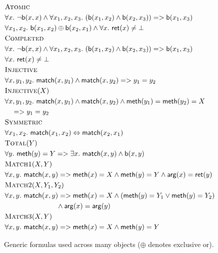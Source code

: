 \begin{figure}
  \footnotesize
  \begin{align*}
    & \textsc{Atomic} \\
    & \forall x.\ \neg {\sf b}(x,x)\land \forall x_1,x_2,x_3.\ ({\sf b}(x_1,x_2) \land {\sf b}(x_2,x_3)) => {\sf b}(x_1,x_3) \\
    & \forall x_1,x_2.\ 
      {\sf b}(x_1,x_2) \oplus {\sf b}(x_2,x_1) \land \forall x.\ {\sf ret}(x) \neq \bot 
    \\
    & \textsc{Completed} \\
    & \forall x.\ \neg {\sf b}(x,x)\land \forall x_1,x_2,x_3.\ ({\sf b}(x_1,x_2) \land {\sf b}(x_2,x_3)) => {\sf b}(x_1,x_3) \\
    & \forall x.\ {\sf ret}(x) \neq \bot
    \\
    & \textsc{Injective} \\
    & \forall x, y_1, y_2.\ {\sf match}(x, y_1) \land {\sf match}(x, y_2) => y_1 = y_2
    \\
    & \textsc{Injective}(X) \\
    & \forall x, y_1, y_2.\ {\sf match}(x, y_1) \land {\sf match}(x, y_2) \land {\sf meth}(y_1)={\sf meth}(y_2)=X \\
    &\quad => y_1 = y_2
    \\
    & \textsc{Symmetric} \\
    & \forall x_1,x_2.\ {\sf match}(x_1,x_2) \Leftrightarrow {\sf match}(x_2,x_1)
    \\
    & \textsc{Total}(Y) \\
    & \forall y.\ {\sf meth}(y) = Y => \exists x.\ {\sf match}(x,y) \land {\sf b}(x,y)
    \\
    & \textsc{Match1}(X,Y) \\
    & \forall x, y.\ {\sf match}(x,y) => 
        {\sf meth}(x) = X \land {\sf meth}(y) = Y \land {\sf arg}(x) = {\sf ret}(y)
    \\
    & \textsc{Match2}(X,Y_1,Y_2) \\
    & \forall x, y.\ {\sf match}(x,y) => 
      {\sf meth}(x) = X \land ({\sf meth}(y) = Y_1 \vee {\sf meth}(y) = Y_2) \\
      & \hspace{2.6cm}\land {\sf arg}(x) = {\sf arg}(y)
    \\
    & \textsc{Match3}(X,Y) \\
      & \forall x, y.\ 
        {\sf match}(x,y) => {\sf meth}(x) = X \land {\sf meth}(y) = Y
  \end{align*}
  \caption{Generic formulas used across many objects ($\oplus$ denotes exclusive or).}
  \label{fig:formulas:common}
\end{figure}

